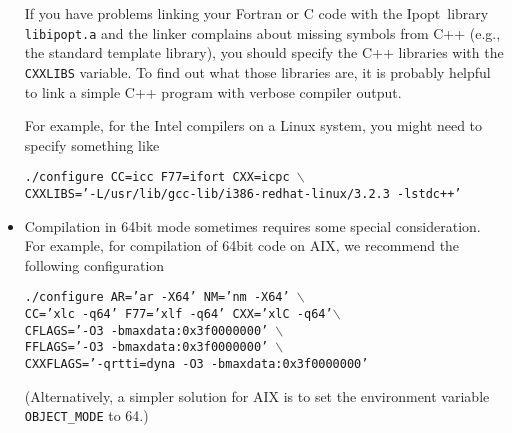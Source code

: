 \documentclass[10pt]{article}
\newcommand{\Ipopt}{{\sc Ipopt}}
\begin{document}
\begin{itemize}
  If you have problems linking your Fortran or C code with the \Ipopt\
  library {\tt libipopt.a} and the linker complains about missing
  symbols from C++ (e.g., the standard template library), you should
  specify the C++ libraries with the {\tt CXXLIBS} variable.  To find out
  what those libraries are, it is probably helpful to link a  simple C++
  program with verbose compiler output.

  For example, for the Intel compilers on a Linux system, you
  might need to specify something like

  {\tt ./configure CC=icc F77=ifort CXX=icpc $\backslash$\\ \hspace*{14ex} CXXLIBS='-L/usr/lib/gcc-lib/i386-redhat-linux/3.2.3 -lstdc++'}

\item Compilation in 64bit mode sometimes requires some special
  consideration.  For example, for compilation of 64bit code on AIX,
  we recommend the following configuration

  {\tt ./configure AR='ar -X64' NM='nm -X64' $\backslash$\\
    \hspace*{14ex} CC='xlc -q64' F77='xlf -q64' CXX='xlC
    -q64'$\backslash$\\ \hspace*{14ex} CFLAGS='-O3
    -bmaxdata:0x3f0000000'
    $\backslash$\\ \hspace*{14ex} FFLAGS='-O3 -bmaxdata:0x3f0000000' $\backslash$\\
    \hspace*{14ex} CXXFLAGS='-qrtti=dyna -O3 -bmaxdata:0x3f0000000'}

  (Alternatively, a simpler solution for AIX is to set the environment variable {\tt OBJECT\_MODE} to 64.)



\end{itemize}
\end{document}
